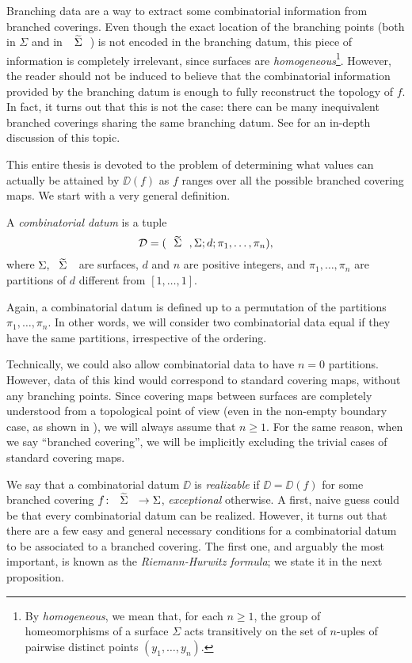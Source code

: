 Branching data are a way to extract some combinatorial information from branched coverings. Even though the exact location of the branching points (both in $\Sigma$ and in $\tSigma$) is not encoded in the branching datum, this piece of information is completely irrelevant, since surfaces are \emph{homogeneous}\footnote{By \emph{homogeneous}, we mean that, for each $n\ge 1$, the group of homeomorphisms of a surface $\Sigma$ acts transitively on the set of $n$-uples of pairwise distinct points $(y_1,\ldots,y_n)$.}. However, the reader should not be induced to believe that the combinatorial information provided by the branching datum is enough to fully reconstruct the topology of $f$. In fact, it turns out that this is not the case: there can be many inequivalent branched coverings sharing the same branching datum. See \cite{sarti} for an in-depth discussion of this topic.

This entire thesis is devoted to the problem of determining what values can actually be attained by $\DD(f)$ as $f$ ranges over all the possible branched covering maps. We start with a very general definition.

\begin{definition}
A \emph{combinatorial datum} is a tuple
\[
\DD=\datum{\tSigma,\Sigma}{d}{\pi_1,\ldots,\pi_n},
\]
where $\Sigma,\tSigma$ are surfaces, $d$ and $n$ are positive integers, and $\pi_1,\ldots,\pi_n$ are partitions of $d$ different from $[1,\ldots,1]$.
\end{definition}

Again, a combinatorial datum is defined up to a permutation of the partitions $\pi_1,\ldots,\pi_n$. In other words, we will consider two combinatorial data equal if they have the same partitions, irrespective of the ordering.

Technically, we could also allow combinatorial data to have $n=0$ partitions. However, data of this kind would correspond to standard covering maps, without any branching points. Since covering maps between surfaces are completely understood from a topological point of view (even in the non-empty boundary case, as shown in \cite{massey-covering}), we will always assume that $n\ge 1$. For the same reason, when we say ``branched covering'', we will be implicitly excluding the trivial cases of standard covering maps.

We say that a combinatorial datum $\DD$ is \emph{realizable} if $\DD=\DD(f)$ for some branched covering $\map{f}{\tSigma}{\Sigma}$, \emph{exceptional} otherwise. A first, naive guess could be that every combinatorial datum can be realized. However, it turns out that there are a few easy and general necessary conditions for a combinatorial datum to be associated to a branched covering. The first one, and arguably the most important, is known as the \emph{Riemann-Hurwitz formula}; we state it in the next proposition.

